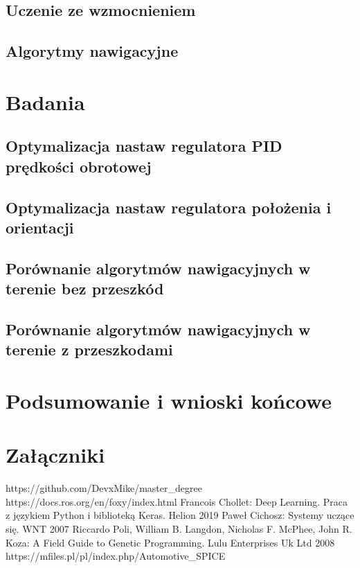 \documentclass[12pt,twoside]{article}
\begin{document}
\subsection{Uczenie ze wzmocnieniem}
\subsection{Algorytmy nawigacyjne}


\section{Badania}
\subsection{Optymalizacja nastaw regulatora PID prędkości obrotowej}
\subsection{Optymalizacja nastaw regulatora położenia i orientacji}
\subsection{Porównanie algorytmów nawigacyjnych w terenie bez przeszkód}
\subsection{Porównanie algorytmów nawigacyjnych w terenie z przeszkodami}

\section{Podsumowanie i wnioski końcowe}


\section*{Załączniki}



\clearpage


\begin{thebibliography}{6}
 https://github.com/DevxMike/master\_degree
 https://docs.ros.org/en/foxy/index.html
 Francois Chollet: Deep Learning. Praca z językiem Python i biblioteką Keras. Helion 2019
 Paweł Cichosz: Systemy uczące się. WNT 2007 
  Riccardo Poli, William B. Langdon, Nicholas F. McPhee, John R. Koza: A Field Guide to Genetic Programming. Lulu Enterprises Uk Ltd 2008
 https://mfiles.pl/pl/index.php/Automotive\_SPICE
\end{thebibliography}

\clearpage

\makesummary
\end{document}

